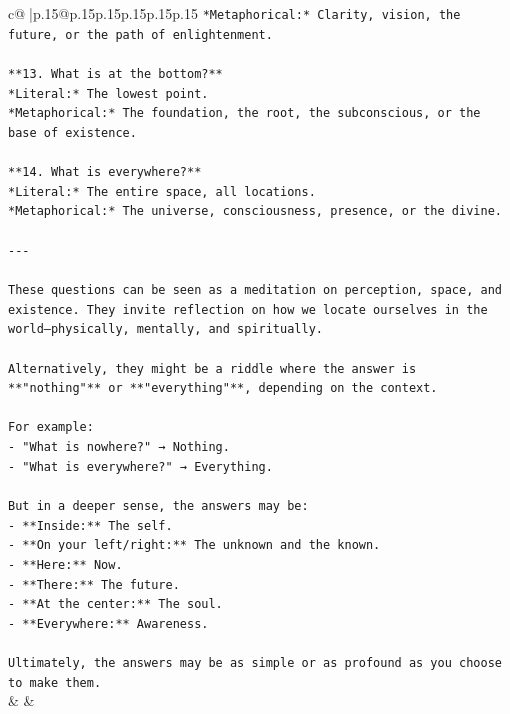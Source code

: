 \documentclass{article}
\begin{document}
{\begin{supertabular}{c@{$\;$}|p{.15\linewidth}@{}p{.15\linewidth}p{.15\linewidth}p{.15\linewidth}p{.15\linewidth}p{.15\linewidth}}
{{{\texttt{*Metaphorical:* Clarity, vision, the future, or the path of enlightenment.} \\
\\ 
\texttt{**13. What is at the bottom?**  } \\
\texttt{*Literal:* The lowest point.  } \\
\texttt{*Metaphorical:* The foundation, the root, the subconscious, or the base of existence.} \\
\\ 
\texttt{**14. What is everywhere?**  } \\
\texttt{*Literal:* The entire space, all locations.  } \\
\texttt{*Metaphorical:* The universe, consciousness, presence, or the divine.} \\
\\ 
\texttt{{-}{-}{-}} \\
\\ 
\texttt{These questions can be seen as a meditation on perception, space, and existence. They invite reflection on how we locate ourselves in the world—physically, mentally, and spiritually.} \\
\\ 
\texttt{Alternatively, they might be a riddle where the answer is **"nothing"** or **"everything"**, depending on the context.} \\
\\ 
\texttt{For example:} \\
\texttt{{-} "What is nowhere?" → Nothing.} \\
\texttt{{-} "What is everywhere?" → Everything.} \\
\\ 
\texttt{But in a deeper sense, the answers may be:} \\
\texttt{{-} **Inside:** The self.} \\
\texttt{{-} **On your left/right:** The unknown and the known.} \\
\texttt{{-} **Here:** Now.} \\
\texttt{{-} **There:** The future.} \\
\texttt{{-} **At the center:** The soul.} \\
\texttt{{-} **Everywhere:** Awareness.} \\
\\ 
\texttt{Ultimately, the answers may be as simple or as profound as you choose to make them.} \\
            }
        }
    }
    & & \\ \\


\end{supertabular}}
\end{document}
